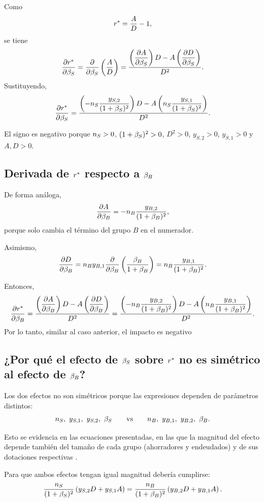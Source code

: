 Como
\[
r^* = \frac{A}{D} - 1,
\]
se tiene
\[
\frac{\partial r^*}{\partial \beta_S}
=
\frac{\partial}{\partial \beta_S}\left(\frac{A}{D}\right)
=
\frac{\left(\dfrac{\partial A}{\partial \beta_S}\right)D - A\left(\dfrac{\partial D}{\partial \beta_S}\right)}{D^2}.
\]
Sustituyendo,
\[
\frac{\partial r^*}{\partial \beta_S}
=
\frac{\left(-n_S \dfrac{y_{S,2}}{(1+\beta_S)^2}\right)D - A\left(n_S \dfrac{y_{S,1}}{(1+\beta_S)^2}\right)}{D^2}.
\]

El signo es negativo porque $n_S>0$, $(1+\beta_S)^2>0$, $D^2>0$, $y_{S,2}>0$, $y_{S,1}>0$ y $A,D>0$.

\subsection*{Derivada de $r^*$ respecto a $\beta_B$}
De forma análoga,
\[
\frac{\partial A}{\partial \beta_B}
=
-n_B \frac{y_{B,2}}{(1+\beta_B)^2},
\]
porque solo cambia el término del grupo $B$ en el numerador.

Asimismo,
\[
\frac{\partial D}{\partial \beta_B}
=
n_B y_{B,1}
\frac{\partial}{\partial \beta_B}
\left(
\frac{\beta_B}{1+\beta_B}
\right)
=
n_B \frac{y_{B,1}}{(1+\beta_B)^2}.
\]

Entonces,
\[
\frac{\partial r^*}{\partial \beta_B}
=
\frac{\left(\dfrac{\partial A}{\partial \beta_B}\right)D - A\left(\dfrac{\partial D}{\partial \beta_B}\right)}{D^2}
=
\frac{\left(-n_B \dfrac{y_{B,2}}{(1+\beta_B)^2}\right)D - A\left(n_B \dfrac{y_{B,1}}{(1+\beta_B)^2}\right)}{D^2}.
\]
Por lo tanto, similar al caso anterior, el impacto es negativo 

\subsection*{¿Por qué el efecto de $\beta_S$ sobre $r^*$ no es simétrico al efecto de $\beta_B$?}
Los dos efectos no son simétricos porque las expresiones dependen de parámetros distintos:
\[
\ns,\ y_{S,1},\ y_{S,2},\ \bs
\qquad \text{vs} \qquad
\nb,\ y_{B,1},\ y_{B,2},\ \bb.
\]

Esto se evidencia en las ecuaciones presentadas, en las que la magnitud del efecto depende también del tamaño de cada grupo (ahorradores y endeudados) y de sus dotaciones respectivas .

Para que ambos efectos tengan igual magnitud debería cumplirse:
\begin{equation}
\frac{n_S}{(1+\beta_S)^2}\left(y_{S,2}D + y_{S,1}A\right)
=
\frac{n_B}{(1+\beta_B)^2}\left(y_{B,2}D + y_{B,1}A\right).
\label{eq:condicion_general}
\end{equation}


